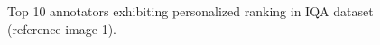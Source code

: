 \documentclass[10pt,journal,cspaper,compsoc]{IEEEtran}
\begin{document}
{\begin{figure}
 \begin{center}
  \caption{Top 10 annotators exhibiting personalized ranking in IQA dataset (reference image 1).}\label{fig:iqaref1preferencepath}
\end{center}
\end{figure}




}
\end{document}
